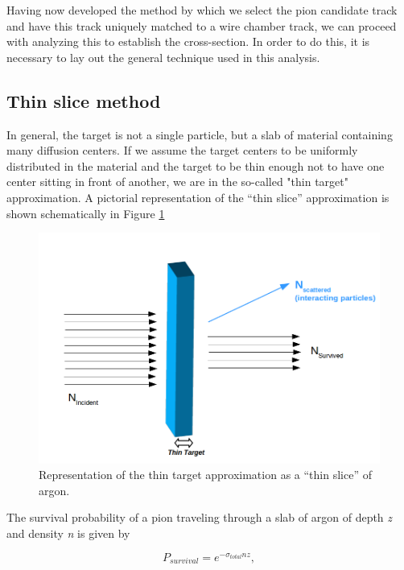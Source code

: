 Having now developed the method by which we select the pion candidate track and have this track uniquely matched to a wire chamber track, we can proceed with analyzing this to establish the cross-section. In order to do this, it is necessary to lay out the general technique used in this analysis.

\subsection{Thin slice method}\label{sec:ThinSlice}
In general, the target is not a single particle, but a slab of material containing many diffusion centers. If we assume the target centers to be uniformly distributed in the material and the target to be thin enough not to have one center sitting in front of another, we are in the so-called  "thin target" approximation. A pictorial representation of the ``thin slice'' approximation is shown schematically in Figure \ref{fig:thinslice}


\begin{figure}[htb]
\centering
\includegraphics[scale=0.25]{./images/ThinTarget.png}
\caption{Representation of the thin target approximation as a ``thin slice'' of argon.}
\label{fig:thinslice}
\end{figure}

The survival probability of a pion traveling through a slab of argon of depth {\it z} and density {\it n} is given by

\begin{equation}
P_{survival} = e^{-\sigma_{total}n z},
\end{equation} 

